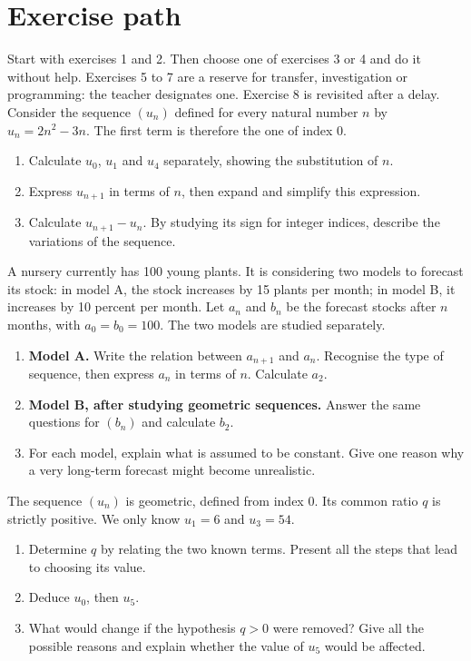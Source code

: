 \section*{Exercise path}\label{C01-PARC}
Start with exercises 1 and 2. Then choose one of exercises 3 or 4 and do it without help. Exercises 5 to 7 are a reserve for transfer, investigation or programming: the teacher designates one. Exercise 8 is revisited after a delay.
\begingroup
{}
Consider the sequence $(u_n)$ defined for every natural number $n$ by $u_n=2n^2-3n$. The first term is therefore the one of index 0.
\begin{enumerate}[label=\arabic*.]
\item Calculate $u_0$, $u_1$ and $u_4$ separately, showing the substitution of $n$.
\item Express $u_{n+1}$ in terms of $n$, then expand and simplify this expression.
\item Calculate $u_{n+1}-u_n$. By studying its sign for integer indices, describe the variations of the sequence.
\end{enumerate}
A nursery currently has 100 young plants. It is considering two models to forecast its stock: in model A, the stock increases by 15 plants per month; in model B, it increases by 10 percent per month. Let $a_n$ and $b_n$ be the forecast stocks after $n$ months, with $a_0=b_0=100$. The two models are studied separately.
\begin{enumerate}[label=\arabic*.]
\item \textbf{Model A.} Write the relation between $a_{n+1}$ and $a_n$. Recognise the type of sequence, then express $a_n$ in terms of $n$. Calculate $a_2$.
\item \textbf{Model B, after studying geometric sequences.} Answer the same questions for $(b_n)$ and calculate $b_2$.
\item For each model, explain what is assumed to be constant. Give one reason why a very long-term forecast might become unrealistic.
\end{enumerate}
The sequence $(u_n)$ is geometric, defined from index 0. Its common ratio $q$ is strictly positive. We only know $u_1=6$ and $u_3=54$.
\begin{enumerate}[label=\arabic*.]
\item Determine $q$ by relating the two known terms. Present all the steps that lead to choosing its value.
\item Deduce $u_0$, then $u_5$.
\item What would change if the hypothesis $q>0$ were removed? Give all the possible reasons and explain whether the value of $u_5$ would be affected.
\end{enumerate}
